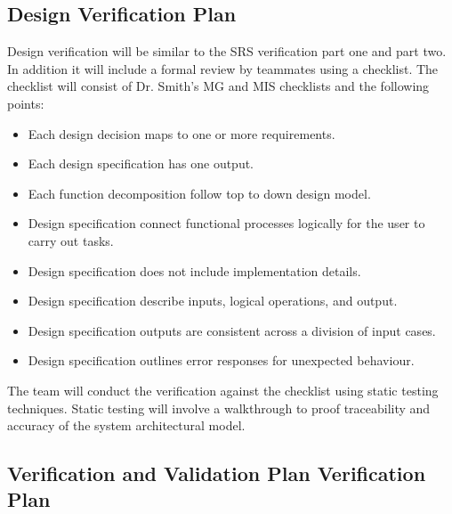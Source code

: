\documentclass[12pt, titlepage]{article}
\begin{document}

\subsection{Design Verification Plan}

Design verification will be similar to the SRS verification part one and
part two. In addition it will include a formal review by teammates using
a checklist. The checklist will consist of Dr. Smith's MG and MIS checklists and the following points:
\begin{itemize}
    \item Each design decision maps to one or more requirements. 
    \item Each design specification has one output. 
    \item Each function decomposition follow top to down design model.
    \item Design specification connect functional processes logically for the user to carry out tasks.
    \item Design specification does not include implementation details.
    \item Design specification describe inputs, logical operations, and output. 
    \item Design specification outputs are consistent across a division of input cases.
    \item Design specification outlines error responses for unexpected behaviour. 
\end{itemize}

The team will conduct the verification against the checklist using 
static testing techniques. Static testing will involve a walkthrough to proof traceability and accuracy of the system architectural model. 




\subsection{Verification and Validation Plan Verification Plan}
\end{document}

